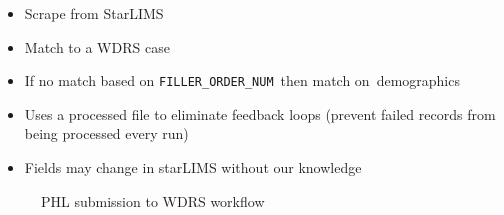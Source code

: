 \documentclass[
  letterpaper,
  DIV=11,
  numbers=noendperiod]{scrartcl}
\providecommand{\tightlist}{%
  \setlength{\itemsep}{0pt}\setlength{\parskip}{0pt}}\usepackage{longtable,booktabs,array}
\begin{document}
\begin{itemize}
\tightlist
\item
  Scrape from StarLIMS\hspace{0pt}
\item
  Match to a WDRS case~\hspace{0pt}
\item
  If no match based on \texttt{FILLER\_ORDER\_NUM}~then match
  on~demographics\hspace{0pt}
\item
  Uses a processed file to eliminate feedback loops (prevent failed
  records from being processed every run)\hspace{0pt}
\item
  Fields may change in starLIMS without our knowledge\hspace{0pt}
\end{itemize}

\begin{figure}[H]


\caption{\label{fig-phlflow}PHL submission to WDRS workflow}

\end{figure}%
\end{document}
